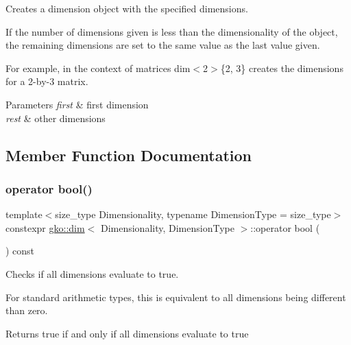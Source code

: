 Creates a dimension object with the specified dimensions. 

If the number of dimensions given is less than the dimensionality of the object, the remaining dimensions are set to the same value as the last value given.

For example, in the context of matrices {\ttfamily dim$<$2$>$\{2, 3\}} creates the dimensions for a 2-\/by-\/3 matrix.


\begin{DoxyParams}{Parameters}
{\em first} & first dimension \\
\hline
{\em rest} & other dimensions \\
\hline
\end{DoxyParams}


\subsection{Member Function Documentation}
\mbox{\label{structgko_1_1dim_a250f37a972c7e3fd0cc4c173e46e577c}} 
\subsubsection{\texorpdfstring{operator bool()}{operator bool()}}
{\footnotesize\ttfamily template$<$size\+\_\+type Dimensionality, typename Dimension\+Type = size\+\_\+type$>$ \\
constexpr \hyperlink{structgko_1_1dim}{gko\+::dim}$<$ Dimensionality, Dimension\+Type $>$\+::operator bool (\begin{DoxyParamCaption}{ }\end{DoxyParamCaption}) const\hspace{0.3cm}{\ttfamily [inline]}}



Checks if all dimensions evaluate to true. 

For standard arithmetic types, this is equivalent to all dimensions being different than zero.

\begin{DoxyReturn}{Returns}
true if and only if all dimensions evaluate to true 
\end{DoxyReturn}
\mbox{\label{structgko_1_1dim_a33151623775cbe4c229a3bd59046de36}} 
